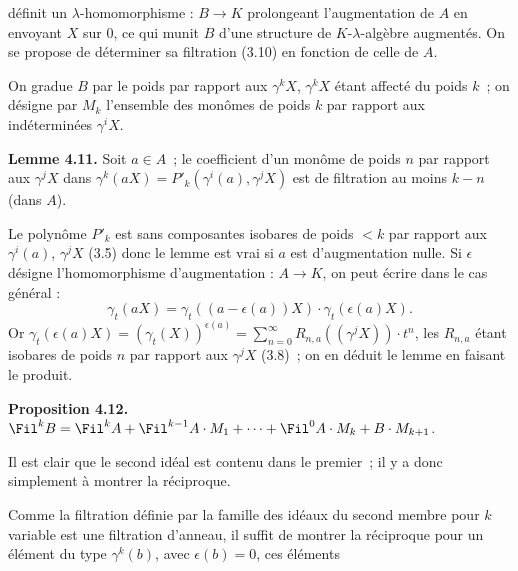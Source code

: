définit un \(\lambda\)-homomorphisme : \(B\to K\) prolongeant l'augmentation de \(A\) en envoyant \(X\) sur \(0\), ce qui munit \(B\) d'une structure de \(K\)-\(\lambda\)-algèbre augmentés. On se propose de déterminer sa filtration (3.10) en fonction de celle de \(A\).

On gradue \(B\) par le poids par rapport aux \(\gamma^k X\), \(\gamma^k X\) étant affecté du poids \(k\)~; on désigne par \(M_k\) l'ensemble des monômes de poids \(k\) par rapport aux indéterminées \(\gamma^i X\).

\textbf{Lemme 4.11.} Soit \(a\in A\)~; le coefficient d'un monôme de poids \(n\) par rapport aux \(\gamma^j X\) dans \(\gamma^k(aX)=P'_k(\gamma^i(a),\gamma^j X)\) est de filtration au moins \(k-n\) (dans \(A\)).

Le polynôme \(P'_k\) est sans composantes isobares de poids \(<k\) par rapport aux \(\gamma^i(a)\), \(\gamma^j X\) (3.5) donc le lemme est vrai si \(a\) est d'augmentation nulle. Si \(\epsilon\) désigne l'homomorphisme d'augmentation : \(A\to K\), on peut écrire dans le cas général :
\[
  \gamma_t(aX)=\gamma_t((a-\epsilon(a))X)\cdot\gamma_t(\epsilon(a)X).
\]
Or \(\gamma_t(\epsilon(a)X)=(\gamma_t(X))^{\epsilon(a)}=\sum_{n=0}^{\infty}R_{n,a}((\gamma^j X))\cdot t^n\), les \(R_{n,a}\) étant isobares de poids \(n\) par rapport aux \(\gamma^j X\) (3.8)~; on en déduit le lemme en faisant le produit.

\textbf{Proposition 4.12.} \(\Fil^k B=\Fil^k A+\Fil^{k-1}A\cdot M_1+\cdots+\Fil^0 A\cdot M_k+B\cdot M_{k+1}\).

Il est clair que le second idéal est contenu dans le premier~; il y a donc simplement à montrer la réciproque.

Comme la filtration définie par la famille des idéaux du second membre pour \(k\) variable est une filtration d'anneau, il suffit de montrer la réciproque pour un élément du type \(\gamma^k(b)\), avec \(\epsilon(b)=0\), ces éléments

